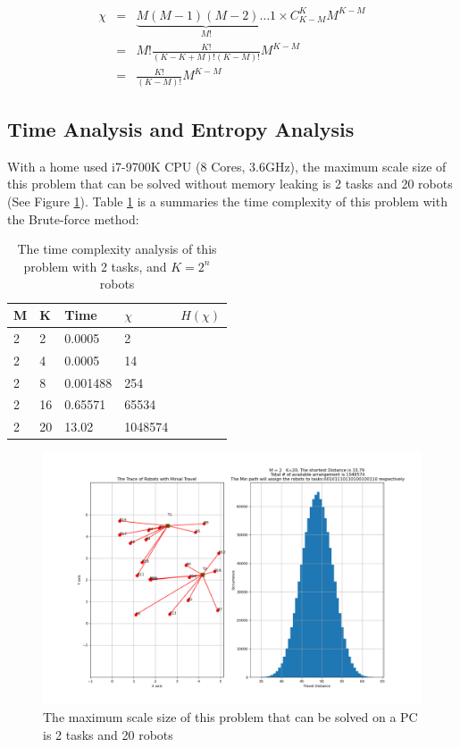 \begin{equation}
\begin{array}{*{20}{c}}
\chi & = &{\underbrace {M\left( {M - 1} \right)\left( {M - 2} \right) \ldots 1}_{M!} \times C_{K - M}^K{M^{K - M}}}\\
{}& = &{M!\frac{{K!}}{{\left( {K - K + M} \right)!\left( {K - M} \right)!}}{M^{K - M}}}\\
{}& = &{\frac{{K!}}{{\left( {K - M} \right)!}}{M^{K - M}}}
\end{array}
\end{equation}

\subsection{Time Analysis and Entropy Analysis}
With a home used i7-9700K CPU (8 Cores, 3.6GHz), the maximum scale size of this problem that can be solved without memory leaking is 2 tasks and 20 robots (See Figure \ref{fig:upperlimit}). Table \ref{tab:bruteforce} is a summaries the time complexity of this problem with the Brute-force method:

\begin{table}[]
    \centering
\begin{tabular}{|l|l|l|l|l|}
\hline
M & K  & Time     & $\chi$       & $H(\chi)$ \\ \hline
2 & 2  & 0.0005   & 2       &   \\ \hline
2 & 4  & 0.0005   & 14      &   \\ \hline
2 & 8  & 0.001488 & 254     &   \\ \hline
2 & 16 & 0.65571  & 65534   &   \\ \hline
2 & 20 & 13.02    & 1048574 &   \\ \hline
\end{tabular}
    \caption{The time complexity analysis of this problem with 2 tasks, and $K = 2^n$ robots}
    \label{tab:bruteforce}
\end{table}

\begin{figure}[h!]
  \centering
  \includegraphics[width=15cm]{Pictures/220.png}
  \caption{The maximum scale size of this problem that can be solved on a PC is 2 tasks and 20 robots}
  \label{fig:upperlimit}
  \Description{}
\end{figure}